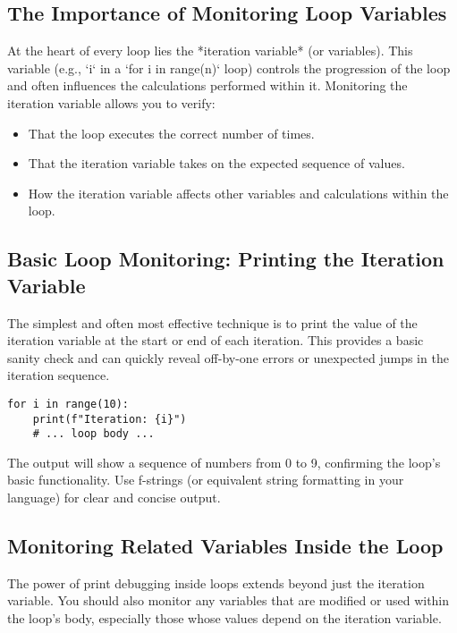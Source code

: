 \documentclass{article}
\begin{document}
{{{\subsection*{The Importance of Monitoring Loop Variables}

At the heart of every loop lies the *iteration variable* (or variables). This variable (e.g., `i` in a `for i in range(n)` loop) controls the progression of the loop and often influences the calculations performed within it. Monitoring the iteration variable allows you to verify:

\begin{itemize}
    \item That the loop executes the correct number of times.
    \item That the iteration variable takes on the expected sequence of values.
    \item How the iteration variable affects other variables and calculations within the loop.
\end{itemize}

\subsection*{Basic Loop Monitoring: Printing the Iteration Variable}

The simplest and often most effective technique is to print the value of the iteration variable at the start or end of each iteration. This provides a basic sanity check and can quickly reveal off-by-one errors or unexpected jumps in the iteration sequence.

\begin{verbatim}
for i in range(10):
    print(f"Iteration: {i}")
    # ... loop body ...
\end{verbatim}

The output will show a sequence of numbers from 0 to 9, confirming the loop's basic functionality.  Use f-strings (or equivalent string formatting in your language) for clear and concise output.

\subsection*{Monitoring Related Variables Inside the Loop}

The power of print debugging inside loops extends beyond just the iteration variable. You should also monitor any variables that are modified or used within the loop's body, especially those whose values depend on the iteration variable.

}}}
\end{document}
